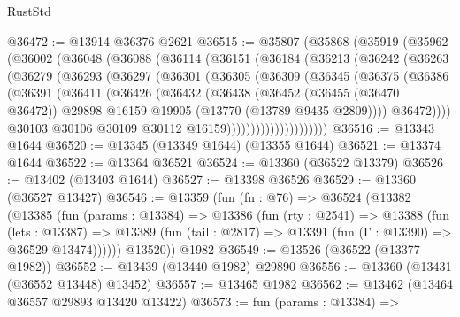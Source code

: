 \begin{lexlean}{RustStd}
\begin{coremodule}
@36472 := @13914 @36376 @2621
@36515 := @35807
    (@35868
      (@35919
        (@35962
          (@36002
            (@36048
              (@36088
                (@36114
                  (@36151
                    (@36184
                      (@36213
                        (@36242
                          (@36263
                            (@36279
                              (@36293
                                (@36297
                                  (@36301
                                    (@36305
                                      (@36309
                                        (@36345
                                          (@36375
                                            (@36386
                                              (@36391
                                                (@36411
                                                  (@36426
                                                    (@36432
                                                      (@36438
                                                        (@36452
                                                          (@36455 (@36470 @36472))
                                                          @29898
                                                          @16159
                                                          @19905
                                                          (@13770 (@13789 @9435 @2809))))
                                                      @36472))))
                                              @30103
                                              @30106
                                              @30109
                                              @30112
                                              @16159)))))))))))))))))))))
@36516 := @13343 @1644
@36520 := @13345 (@13349 @1644) (@13355 @1644)
@36521 := @13374 @1644
@36522 := @13364 @36521
@36524 := @13360 (@36522 @13379)
@36526 := @13402 (@13403 @1644)
@36527 := @13398 @36526
@36529 := @13360 (@36527 @13427)
@36546 := @13359
    (fun (fn : @76) =>
    @36524
      (@13382
        (@13385
          (fun (params : @13384) =>
          @13386
            (fun (rty : @2541) =>
            @13388
              (fun (lets : @13387) =>
              @13389 (fun (tail : @2817) => @13391 (fun (Γ : @13390) => @36529 @13474))))))
        @13520))
    @1982
@36549 := @13526 (@36522 (@13377 @1982))
@36552 := @13439 (@13440 @1982) @29890
@36556 := @13360 (@13431 (@36552 @13448) @13452)
@36557 := @13465 @1982
@36562 := @13462 (@13464 @36557 @29893 @13420 @13422)
@36573 := fun (params : @13384) =>

\end{coremodule}
\end{lexlean}
